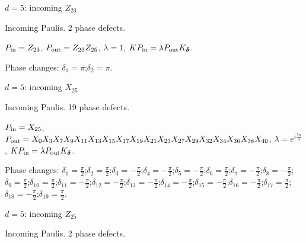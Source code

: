 {\Large $d=5$: incoming $Z_{23}$}\par
Incoming Paulis. 2 phase defects.
\begin{center}
\end{center}
\vspace{-1mm}
$P_{\rm in}=Z_{23}$, \quad $P_{\rm out}=Z_{23}Z_{25}$, \quad $\lambda=1$, \qquad $K P_{\rm in}=\lambda P_{\rm out}K_{\boldsymbol\delta}$.
\par\smallskip\begin{minipage}{.98\linewidth}\small Phase changes: $\delta_{1}=\pi$;\quad $\delta_{2}=\pi$.\end{minipage}
\vfill
{\footnotesize\texttt{}}
\newpage
{}
{\Large $d=5$: incoming $X_{25}$}\par
Incoming Paulis. 19 phase defects.
\begin{center}
\end{center}
\vspace{-1mm}
$P_{\rm in}=X_{25}$, \quad $P_{\rm out}=X_{0}X_{3}X_{7}X_{9}X_{11}X_{13}X_{15}X_{17}X_{19}X_{21}X_{23}X_{27}X_{29}X_{32}X_{34}X_{36}X_{38}X_{40}$, \quad $\lambda=e^{i\frac{5\pi}{4}}$, \qquad $K P_{\rm in}=\lambda P_{\rm out}K_{\boldsymbol\delta}$.
\par\smallskip\begin{minipage}{.98\linewidth}\small Phase changes: $\delta_{1}=\frac{\pi}{2}$;\quad $\delta_{2}=\frac{\pi}{2}$;\quad $\delta_{3}=-\frac{\pi}{2}$;\quad $\delta_{4}=-\frac{\pi}{2}$;\quad $\delta_{5}=-\frac{\pi}{2}$;\quad $\delta_{6}=\frac{\pi}{2}$;\quad $\delta_{7}=-\frac{\pi}{2}$;\quad $\delta_{8}=-\frac{\pi}{2}$;\quad $\delta_{9}=\frac{\pi}{2}$;\quad $\delta_{10}=\frac{\pi}{2}$;\quad $\delta_{11}=-\frac{\pi}{2}$;\quad $\delta_{12}=-\frac{\pi}{2}$;\quad $\delta_{13}=-\frac{\pi}{2}$;\quad $\delta_{14}=-\frac{\pi}{2}$;\quad $\delta_{15}=-\frac{\pi}{2}$;\quad $\delta_{16}=-\frac{\pi}{2}$;\quad $\delta_{17}=\frac{\pi}{2}$;\quad $\delta_{18}=-\frac{\pi}{2}$;\quad $\delta_{19}=\frac{\pi}{2}$.\end{minipage}
\vfill
{\footnotesize\texttt{}}
\newpage
{}
{\Large $d=5$: incoming $Z_{25}$}\par
Incoming Paulis. 2 phase defects.
\begin{center}
\end{center}
